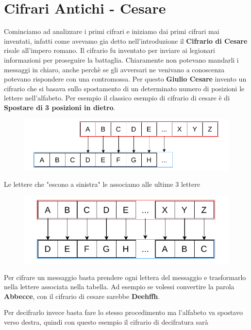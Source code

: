 \documentclass{report}
\begin{document}
\section{Cifrari Antichi - Cesare}

Cominciamo ad analizzare i primi cifrari e iniziamo dai primi cifrari mai inventati, infatti come avevamo gia detto nell'introduzione il \textbf{Cifrario di Cesare} risale all'impero romano. Il cifrario fu inventato per inviare ai legionari informazioni per proseguire la battaglia. Chiaramente non potevano mandarli i messaggi in chiaro, anche perchè se gli avversari ne venivano a conoscenza potevano rispondere con una contromossa. Per questo \textbf{Giulio Cesare} invento un cifrario che si basava sullo spostamento di un determinato numero di posizioni le lettere nell'alfabeto. Per esempio il classico esempio di cifrario di cesare è di \textbf{Spostare di 3 posizioni in dietro}. 

\begin{figure}[h]
    \centering
    \includegraphics[width=\linewidth]{logos/1_1_cripto.pdf}
\end{figure}


Le lettere che "escono a sinistra" le associamo alle ultime 3 lettere

\begin{figure}[h]
    \centering
    \includegraphics[width=0.8\linewidth]{logos/1_2_cripto.pdf}
\end{figure}

Per cifrare un messaggio basta prendere ogni lettera del messaggio e trasformarlo nella lettere associata nella tabella. Ad esempio se volessi convertire la parola \textbf{Abbecce}, con il cifrario di cesare sarebbe \textbf{Deehffh}. 

Per decifrarlo invece basta fare lo stesso procedimento ma l'alfabeto va spostavo verso destra, quindi con questo esempio il cifrario di decifratura sarà
\end{document}
